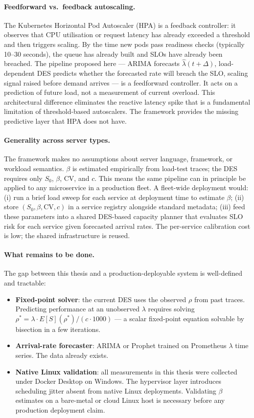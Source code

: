 \paragraph{Feedforward vs.\ feedback autoscaling.}
The Kubernetes Horizontal Pod Autoscaler (HPA) is a feedback controller: it observes that CPU utilisation or request latency has already exceeded a threshold and then triggers scaling. By the time new pods pass readiness checks (typically 10--30 seconds), the queue has already built and SLOs have already been breached. The pipeline proposed here — ARIMA forecasts $\hat{\lambda}(t+\Delta)$, load-dependent DES predicts whether the forecasted rate will breach the SLO, scaling signal raised before demand arrives — is a feedforward controller. It acts on a prediction of future load, not a measurement of current overload. This architectural difference eliminates the reactive latency spike that is a fundamental limitation of threshold-based autoscalers. The framework provides the missing predictive layer that HPA does not have.

\paragraph{Generality across server types.}
The framework makes no assumptions about server language, framework, or workload semantics. $\beta$ is estimated empirically from load-test traces; the DES requires only $S_0$, $\beta$, CV, and $c$. This means the same pipeline can in principle be applied to any microservice in a production fleet. A fleet-wide deployment would: (i) run a brief load sweep for each service at deployment time to estimate $\beta$; (ii) store $(S_0, \beta, \text{CV}, c)$ in a service registry alongside standard metadata; (iii) feed these parameters into a shared DES-based capacity planner that evaluates SLO risk for each service given forecasted arrival rates. The per-service calibration cost is low; the shared infrastructure is reused.

\paragraph{What remains to be done.}
The gap between this thesis and a production-deployable system is well-defined and tractable:
\begin{itemize}
    \item \textbf{Fixed-point solver}: the current DES uses the observed $\rho$ from past traces. Predicting performance at an unobserved $\lambda$ requires solving $\rho^* = \lambda \cdot E[S](\rho^*) / (c \cdot 1000)$ — a scalar fixed-point equation solvable by bisection in a few iterations.
    \item \textbf{Arrival-rate forecaster}: ARIMA or Prophet trained on Prometheus $\lambda$ time series. The data already exists.
    \item \textbf{Native Linux validation}: all measurements in this thesis were collected under Docker Desktop on Windows. The hypervisor layer introduces scheduling jitter absent from native Linux deployments. Validating $\beta$ estimates on a bare-metal or cloud Linux host is necessary before any production deployment claim.
\end{itemize}

